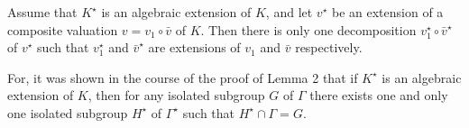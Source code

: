Assume that $K^\star$ is an algebraic extension of $K$, and let $v^\star$ be an extension of a composite valuation $v = v_1 \circ \bar{v}$ of $K$. Then there is only one decomposition $v_1^\star \circ \bar{v}^\star$ of $v^\star$ such that $v_1^\star$ and $\bar{v}^\star$ are extensions of $v_1$ and $\bar{v}$ respectively.

For, it was shown in the course of the proof of Lemma 2 that if $K^\star$ is an algebraic extension of $K$, then for any isolated subgroup $G$ of $\Gamma$ there exists one and only one isolated subgroup $H^\star$ of $\Gamma^\star$ such that $H^\star \cap \Gamma = G$.